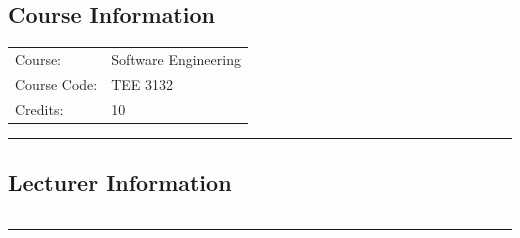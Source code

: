 
\subsection*{Course Information}
\vspace{0ex}%
\noindent\parbox{0.5\textwidth}{%
    \noindent\begin{tabular}{@{}ll}
                 \textsf{Course:}          & 	Software Engineering \\
                 \textsf{Course Code:}         & 	TEE 3132    \\
                 \textsf{Credits:}    & 	10
    \end{tabular}}
\vspace{2ex}\hrule\vspace{2ex}

\subsection*{Lecturer Information}
\noindent\parbox{0.5\textwidth}{%
    \noindent\begin{tabular}{@{}ll}
                 
    \end{tabular}}
\vspace{2ex}\hrule\vspace{2ex}


